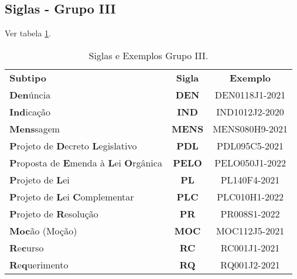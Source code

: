 \subsection{Siglas - Grupo III}

Ver tabela \ref{tab:cod:grupoiii}.

\begin{table}[b]
	\begin{center}
		\begin{tabular}{|p{}|c|c|}
			\hline
			\rowcolor{lightgray!50} \multicolumn{3}{|c|}{\Large Siglas Grupo III - Minutas de Parecer \normalsize} \\ \hline \hline
			\rowcolor{lightgray}\textbf{Subtipo} & \textbf{Sigla} & \textbf{Exemplo} \\ \hline
			\rowcolor{corCOULD!10} \textbf{Den}úncia & \textbf{DEN} & DEN0118J1-2021 \\ \hline
			\rowcolor{corCOULD!10} \textbf{Ind}icação & \textbf{IND} & IND1012J2-2020 \\ \hline
			\rowcolor{corCOULD!10} \textbf{Mens}sagem & \textbf{MENS} & MENS080H9-2021 \\ \hline
			\rowcolor{corCOULD!10} \textbf{P}rojeto de \textbf{D}ecreto \textbf{L}egislativo & \textbf{PDL} & PDL095C5-2021 \\ \hline
			\rowcolor{corCOULD!10} \textbf{P}roposta de \textbf{E}menda à \textbf{L}ei \textbf{O}rgânica & \textbf{PELO} & PELO050J1-2022 \\ \hline
			\rowcolor{corCOULD!10} \textbf{P}rojeto de \textbf{L}ei & \textbf{PL} & PL140F4-2021 \\ \hline
			\rowcolor{corCOULD!10} \textbf{P}rojeto de \textbf{L}ei \textbf{C}omplementar & \textbf{PLC} & PLC010H1-2022 \\ \hline
			\rowcolor{corCOULD!10} \textbf{P}rojeto de \textbf{R}esolução & \textbf{PR} & PR008S1-2022 \\ \hline
			\rowcolor{corCOULD!10} \textbf{Moc}ão (Moção) & \textbf{MOC} & MOC112J5-2021 \\ \hline
			\rowcolor{corCOULD!10} \textbf{R}e\textbf{c}urso & \textbf{RC} & RC001J1-2021 \\ \hline			
			\rowcolor{corCOULD!10} \textbf{R}e\textbf{q}uerimento & \textbf{RQ} & RQ001J2-2021 \\ \hline
		\end{tabular}    
		\caption{\label{tab:cod:grupoiii} Siglas e Exemplos Grupo III.}
	\end{center}
\end{table}

